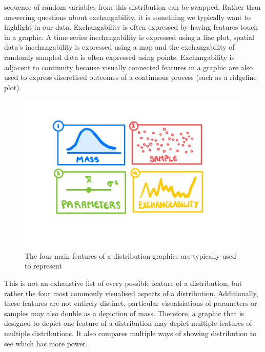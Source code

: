 \documentclass[
  letterpaper,
  DIV=11,
  numbers=noendperiod]{scrartcl}
\begin{document}
\begin{enumerate}
  sequence of random variables from this distribution can be swapped.
  Rather than answering questions about exchangability, it is something
  we typically want to highlight in our data. Exchangability is often
  expressed by having features touch in a graphic. A time series
  inechangability is expressed using a line plot, spatial data's
  inechangability is expressed using a map and the exchangability of
  randomly sampled data is often expressed using points. Exchangability
  is adjacent to continuity because visually connected features in a
  graphic are also used to express discretised outcomes of a continuous
  process (such as a ridgeline plot).
\end{enumerate}

\begin{figure}

{\centering \includegraphics{distfeatures.jpeg}

}

\caption{\label{fig-features}The four main features of a distribution
graphics are typically used to represent}

\end{figure}

This is not an exhaustive list of every possible feature of a
distribution, but rather the four most commonly visualised aspects of a
distribution. Additionally, these features are not entirely distinct,
particular visualsiations of parameters or samples may also double as a
depiction of mass. Therefore, a graphic that is designed to depict one
feature of a distribution may depict multiple features of multiple
distributions. It also compares multiple ways of showing distribution to
see which has more power.
\end{document}
